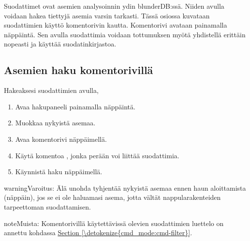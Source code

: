 \documentclass[letterpaper,10pt,finnish]{sphinxmanual}
\begin{document}
\sphinxAtStartPar
Suodattimet ovat asemien analysoinnin ydin blunderDB:ssä. Niiden avulla voidaan hakea tiettyjä asemia varsin tarkasti. Tässä osiossa kuvataan suodattimien käyttö komentorivin kautta. Komentorivi avataan painamalla \sphinxhyphen{}näppäintä. Sen avulla suodattimia voidaan tottumuksen myötä yhdistellä erittäin nopeasti ja käyttää suodatinkirjastoa.


\subsection{Asemien haku komentorivillä}
\label{\detokenize{annexe_filtres:recherche-de-positions-en-ligne-de-commande}}
\sphinxAtStartPar
Hakeaksesi suodattimien avulla,
\begin{enumerate}
%
\item {} 
\sphinxAtStartPar
Avaa hakupaneeli painamalla \sphinxhyphen{}näppäintä.

\item {} 
\sphinxAtStartPar
Muokkaa nykyistä asemaa.

\item {} 
\sphinxAtStartPar
Avaa komentorivi \sphinxhyphen{}näppäimellä.

\item {} 
\sphinxAtStartPar
Käytä komentoa , jonka perään voi liittää suodattimia.

\item {} 
\sphinxAtStartPar
Käynnistä haku \sphinxhyphen{}näppäimellä.

\end{enumerate}

\begin{sphinxadmonition}{warning}{Varoitus:}
\sphinxAtStartPar
Älä unohda tyhjentää nykyistä asemaa ennen haun aloittamista (\sphinxhyphen{}näppäin), jos se ei ole haluamasi asema, jotta vältät nappularakenteiden tarpeettoman suodattamisen.
\end{sphinxadmonition}

\begin{sphinxadmonition}{note}{Muista:}
\sphinxAtStartPar
Komentorivillä käytettävissä olevien suodattimien luettelo on annettu kohdassa \hyperref[\detokenize{cmd_mode:cmd-filter}]{Section \ref{\detokenize{cmd_mode:cmd-filter}}}.
\end{sphinxadmonition}
\end{document}
